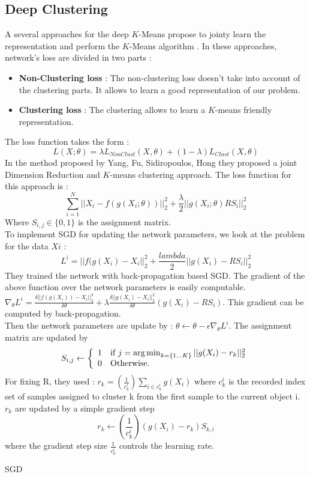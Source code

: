 \subsection{Deep Clustering}\label{seq:DeepClust}
A several approaches for the deep $K$-Means propose to jointy learn the
representation and perform the $K$-Means algorithm \cite{2018arXiv180107648A}.
In these approaches, network's loss are divided in two parts :
\begin{itemize}
\item \textbf{Non-Clustering loss} : The non-clustering loss doesn't
  take into account of the clustering parts. It allows to learn a good
  representation of our problem.
\item \textbf{Clustering loss} : The clustering allows to learn a
  $K$-means friendly representation.
\end{itemize}
The loss function takes the form :
$$
L(X;\theta) = \lambda L_{NonClust}(X,\theta) + (1-\lambda)L_{Clust}
(X,\theta)
$$
In the method proposed by Yang, Fu, Sidiropoulos, Hong \cite{2016arXiv161004794Y}
they proposed a joint Dimension Reduction and
$K$-means clustering approach. The loss function for this approach is :
$$ \sum_{i=1}^N ||X_i - f(g(X_i;\theta))||_2^2 + \frac{\lambda}{2}
||g(X_i;\theta)RS_i||_2^2$$
Where $S_{i, j} \in \{0,1\}$ is the assignment matrix.
\\To implement SGD for updating the network parameters, we look at
the problem for the data
$Xi$ :
$$ L^i = ||f(g(X_i) -X_i||_2^2 + \frac{lambda}{2}||g(X_i) -RS_i||_2^2$$
They trained the network with back-propagation based SGD. The
gradient of the above function over the network parameters is easily
computable. $\nabla_\theta L^i = \frac{\delta||f(g(X_i)) -X_i||_2^2}
{\delta\theta} + \lambda\frac{\delta||g(X_i) -X_i||_2^2}{\delta \theta}
(g(X_i) - RS_i)$. This gradient can be computed by back-propagation.\\
Then the network parameters are update by : $\theta \gets \theta -
\epsilon\nabla_\theta L^i$. The assignment matrix are updated by
\begin{equation*}
  S_{i,j} \gets \left\{
\begin{array}{ll}
  1 & \mbox{if } j = \operatorname*{arg\,min}_{k = \{1 ... K\}}||g(X_i) - r_k||_2^2\\
  0 & \mbox{Otherwise.}
\end{array}
\right.
\end{equation*}
For fixing R, they used : $r_k = (\frac{1}{c_k^i})\sum_{i \in c_k^i}
g(X_i)$ where $c_k^i$ is the recorded index set of samples assigned to
cluster k from the first sample to the current object i.
$r_k$ are updated by a simple gradient step
$$r_k \gets (\frac{1}{c_k^i})(g(X_i)-r_k)S_{k,i}$$
where the gradient step size $\frac{1}{c_k^i}$ controls the learning
rate.
\begin{algorithm}[!h]
  \caption{SGD}
\end{algorithm}
